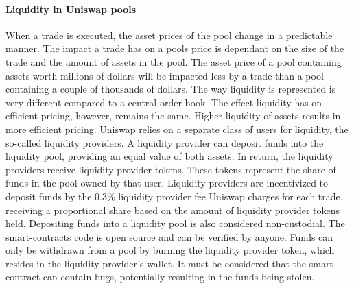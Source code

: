 \documentclass[../../thesis.tex]{subfiles}
\begin{document}
\paragraph{Liquidity in Uniswap pools}
When a trade is executed, the asset prices of the pool change in a predictable manner. The impact a trade has on a pools price is dependant on the size of the trade and the amount of assets in the pool. The asset price of a pool containing assets worth millions of dollars will be impacted less by a trade than a pool containing a couple of thousands of dollars. The way liquidity is represented is very different compared to a central order book. The effect liquidity has on efficient pricing, however, remains the same. Higher liquidity of assets results in more efficient pricing. 
Uniswap relies on a separate class of users for liquidity, the so-called liquidity providers. A liquidity provider can deposit funds into the liquidity pool, providing an equal value of both assets. In return, the liquidity providers receive liquidity provider tokens. These tokens represent the share of funds in the pool owned by that user. Liquidity providers are incentivized to deposit funds by the 0.3\% liquidity provider fee Uniswap charges for each trade, receiving a proportional share based on the amount of liquidity provider tokens held. Depositing funds into a liquidity pool is also considered non-custodial. The smart-contracts code is open source and can be verified by anyone. Funds can only be withdrawn from a pool by burning the liquidity provider token, which resides in the liquidity provider's wallet. It must be considered that the smart-contract can contain bugs, potentially resulting in the funds being stolen.
\end{document}

